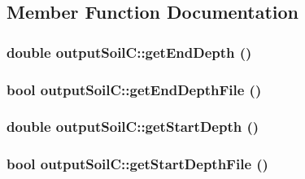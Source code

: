 \subsection{Member Function Documentation}
\hypertarget{classoutput_soil_c_a28eb8864858a89922a764f92515f9621}{
\subsubsection[{getEndDepth}]{\setlength{\rightskip}{0pt plus 5cm}double outputSoilC::getEndDepth ()}}
\label{classoutput_soil_c_a28eb8864858a89922a764f92515f9621}
\hypertarget{classoutput_soil_c_a459b129365848e905ab816d90feb95b3}{
\subsubsection[{getEndDepthFile}]{\setlength{\rightskip}{0pt plus 5cm}bool outputSoilC::getEndDepthFile ()}}
\label{classoutput_soil_c_a459b129365848e905ab816d90feb95b3}
\hypertarget{classoutput_soil_c_a94147be4e9bc87c91e33f64ed23e4ce7}{
\subsubsection[{getStartDepth}]{\setlength{\rightskip}{0pt plus 5cm}double outputSoilC::getStartDepth ()}}
\label{classoutput_soil_c_a94147be4e9bc87c91e33f64ed23e4ce7}
\hypertarget{classoutput_soil_c_a78674bb0f37aeb3265f1462076d8ff34}{
\subsubsection[{getStartDepthFile}]{\setlength{\rightskip}{0pt plus 5cm}bool outputSoilC::getStartDepthFile ()}}
